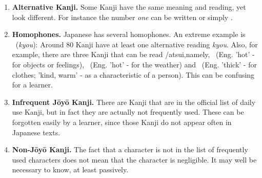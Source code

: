 \begin{enumerate}
  \item \textbf{Alternative Kanji.} Some Kanji have the same meaning and reading,
        yet look different. For instance the number \emph{one} can be written
         or simply .

  \item \textbf{Homophones.} Japanese has several homophones. An extreme example
        is ~(\emph{kyou}): Around 80 Kanji have at least one 
        alternative reading \emph{kyou}. 
        Also, for example, there are three Kanji 
        that can be read /atsui,namely, 
        ~(Eng. 'hot' - for objects or feelings), 
        ~(Eng. 'hot' - for the weather) and 
        ~(Eng. 'thick' - for clothes; 'kind, warm' - as a 
        characteristic of a person). This can be confusing for a learner.

  \item \textbf{Infrequent Jōyō Kanji.} There are Kanji that are in the official
        list of daily use Kanji, but in fact they are actually not frequently 
        used. These can be forgotten easily by a learner, since those Kanji do 
        not appear often in Japanese texts.

  \item \textbf{Non-Jōyō Kanji.} The fact that a character is not in the list 
        of frequently used characters does not mean that the character is 
        negligible. It may well be necessary to know, at least passively.
\end{enumerate}

